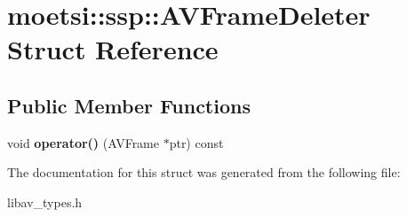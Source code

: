 \hypertarget{structmoetsi_1_1ssp_1_1AVFrameDeleter}{}\section{moetsi\+:\+:ssp\+:\+:A\+V\+Frame\+Deleter Struct Reference}
\label{structmoetsi_1_1ssp_1_1AVFrameDeleter}
\subsection*{Public Member Functions}
\begin{DoxyCompactItemize}
\item 
\mbox{\label{structmoetsi_1_1ssp_1_1AVFrameDeleter_a6ba0e16802a2c92ffa1d6966ca6913d7}} 
void {\bfseries operator()} (A\+V\+Frame $\ast$ptr) const
\end{DoxyCompactItemize}


The documentation for this struct was generated from the following file\+:\begin{DoxyCompactItemize}
\item 
libav\+\_\+types.\+h\end{DoxyCompactItemize}
